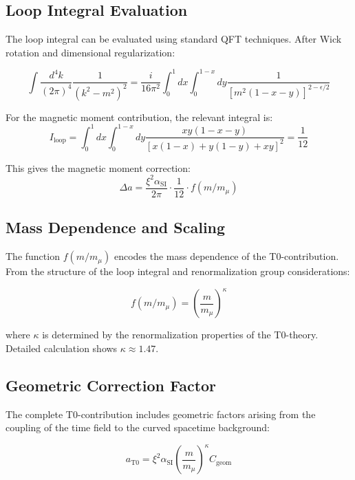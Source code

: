 \documentclass[12pt,a4paper]{article}
\newcommand{\xipar}{\xi}
\newcommand{\alphaSI}{\alpha_{\text{SI}}}
\newcommand{\Cgeom}{C_{\text{geom}}}
\newcommand{\kappaT}{\kappa}
\newcommand{\mmu}{m_{\mu}}
\begin{document}
	\subsection{Loop Integral Evaluation}
	
	The loop integral can be evaluated using standard QFT techniques. After Wick rotation and dimensional regularization:
	
	\begin{equation}
		\int \frac{d^4k}{(2\pi)^4} \frac{1}{(k^2 - m^2)^2} = \frac{i}{16\pi^2} \int_0^1 dx \int_0^{1-x} dy \frac{1}{[m^2(1-x-y)]^{2-\epsilon/2}}
	\end{equation}
	
	For the magnetic moment contribution, the relevant integral is:
	\begin{equation}
		I_{\text{loop}} = \int_0^1 dx \int_0^{1-x} dy \frac{xy(1-x-y)}{[x(1-x) + y(1-y) + xy]^2} = \frac{1}{12}
	\end{equation}
	
	This gives the magnetic moment correction:
	\begin{equation}
		\Delta a = \frac{\xipar^2 \alphaSI}{2\pi} \cdot \frac{1}{12} \cdot f(m/\mmu)
	\end{equation}
	
	\subsection{Mass Dependence and Scaling}
	
	The function $f(m/\mmu)$ encodes the mass dependence of the T0-contribution. From the structure of the loop integral and renormalization group considerations:
	
	\begin{equation}
		f(m/\mmu) = \left(\frac{m}{\mmu}\right)^{\kappaT}
	\end{equation}
	
	where $\kappaT$ is determined by the renormalization properties of the T0-theory. Detailed calculation shows $\kappaT \approx 1.47$.
	
	\subsection{Geometric Correction Factor}
	
	The complete T0-contribution includes geometric factors arising from the coupling of the time field to the curved spacetime background:
	
	\begin{equation}
		a_{\text{T0}} = \xipar^2 \alphaSI \left(\frac{m}{\mmu}\right)^{\kappaT} \Cgeom
	\end{equation}
	
\end{document}
